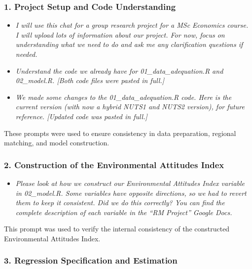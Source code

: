 \documentclass[12pt, a4paper]{article}
\begin{document}
\subsubsection*{1. Project Setup and Code Understanding}

\begin{itemize}
\item \textit{I will use this chat for a group research project for a MSc Economics course. I will upload lots of information about our project. For now, focus on understanding what we need to do and ask me any clarification questions if needed.}

\item \textit{Understand the code we already have for 01\_data\_adequation.R and 02\_model.R. [Both code files were pasted in full.]}

\item \textit{We made some changes to the 01\_data\_adequation.R code. Here is the current version (with now a hybrid NUTS1 and NUTS2 version), for future reference. [Updated code was pasted in full.]}
\end{itemize}

These prompts were used to ensure consistency in data preparation, regional matching, and model construction.


\subsubsection*{2. Construction of the Environmental Attitudes Index}

\begin{itemize}
\item \textit{Please look at how we construct our Environmental Attitudes Index variable in 02\_model.R. Some variables have opposite directions, so we had to revert them to keep it consistent. Did we do this correctly? You can find the complete description of each variable in the ``RM Project'' Google Docs.}
\end{itemize}

This prompt was used to verify the internal consistency of the constructed Environmental Attitudes Index.


\subsubsection*{3. Regression Specification and Estimation}
\end{document}
